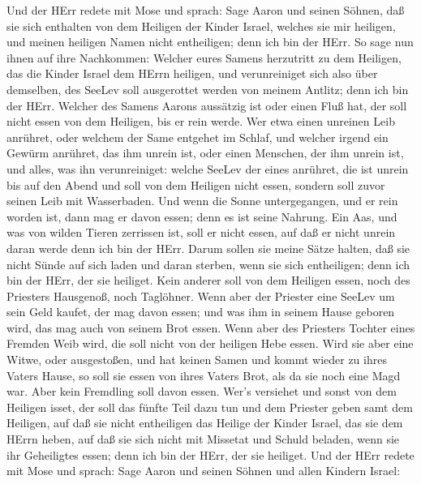  Und der HErr redete mit Mose und sprach:  Sage
Aaron und seinen Söhnen, daß sie sich enthalten von dem Heiligen der
Kinder Israel, welches sie mir heiligen, und meinen heiligen Namen nicht
entheiligen; denn ich bin der HErr.  So sage nun ihnen auf
ihre Nachkommen: Welcher eures Samens herzutritt zu dem Heiligen, das
die Kinder Israel dem HErrn heiligen, und verunreiniget sich also über
demselben, des SeeLev soll ausgerottet werden von meinem Antlitz; denn
ich bin der HErr.  Welcher des Samens Aarons aussätzig ist
oder einen Fluß hat, der soll nicht essen von dem Heiligen, bis er rein
werde. Wer etwa einen unreinen Leib anrühret, oder welchem der Same
entgehet im Schlaf,  und welcher irgend ein Gewürm anrühret,
das ihm unrein ist, oder einen Menschen, der ihm unrein ist, und alles,
was ihn verunreiniget:  welche SeeLev der eines anrühret,
die ist unrein bis auf den Abend und soll von dem Heiligen nicht essen,
sondern soll zuvor seinen Leib mit Wasserbaden.  Und wenn
die Sonne untergegangen, und er rein worden ist, dann mag er davon
essen; denn es ist seine Nahrung.  Ein Aas, und was von
wilden Tieren zerrissen ist, soll er nicht essen, auf daß er nicht
unrein daran werde denn ich bin der HErr.  Darum sollen sie
meine Sätze halten, daß sie nicht Sünde auf sich laden und daran
sterben, wenn sie sich entheiligen; denn ich bin der HErr, der sie
heiliget.  Kein anderer soll von dem Heiligen essen, noch
des Priesters Hausgenoß, noch Taglöhner.  Wenn aber der
Priester eine SeeLev um sein Geld kaufet, der mag davon essen; und was
ihm in seinem Hause geboren wird, das mag auch von seinem Brot essen.
 Wenn aber des Priesters Tochter eines Fremden Weib wird,
die soll nicht von der heiligen Hebe essen.  Wird sie aber
eine Witwe, oder ausgestoßen, und hat keinen Samen und kommt wieder zu
ihres Vaters Hause, so soll sie essen von ihres Vaters Brot, als da sie
noch eine Magd war. Aber kein Fremdling soll davon essen. 
Wer's versiehet und sonst von dem Heiligen isset, der soll das fünfte
Teil dazu tun und dem Priester geben samt dem Heiligen, 
auf daß sie nicht entheiligen das Heilige der Kinder Israel, das sie dem
HErrn heben,  auf daß sie sich nicht mit Missetat und
Schuld beladen, wenn sie ihr Geheiligtes essen; denn ich bin der HErr,
der sie heiliget.  Und der HErr redete mit Mose und sprach:
 Sage Aaron und seinen Söhnen und allen Kindern Israel:
